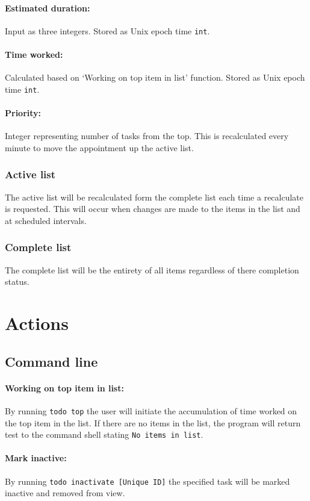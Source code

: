 \documentclass[12pt]{article}
\newcommand{\e}[1] {{\tt #1}}
\begin{document}
\paragraph{Estimated duration:} Input as three integers. Stored as Unix epoch time \e{int}.
\paragraph{Time worked:} Calculated based on `Working on top item in list' function. Stored as Unix epoch time \e{int}. 
\paragraph{Priority:} Integer representing number of tasks from the top. This is recalculated every minute to move the appointment up the active list.

\subsubsection{Active list} \label{sec:Active list}
The active list will be recalculated form the complete list each time a recalculate is requested.  This will occur when changes are made to the items in the list and at scheduled intervals.

\subsubsection{Complete list} \label{sec:Complete list}
The complete list will be the entirety of all items regardless of there completion status.

\section{Actions}
\subsection{Command line}
\setcounter{paragraph}{0}
\setcounter{subsubsection}{0}
\paragraph{Working on top item in list:} \label{sec:Working on top} By running \e{todo top} the user will initiate the accumulation of time worked on the top item in the list. If there are no items in the list, the program will return test to the command shell stating \e{No items in list}.
\paragraph{Mark inactive:} \label{sec:Mark inactive} By running \e{todo inactivate [Unique ID]} the specified task will be marked inactive and removed from view.
\end{document}
